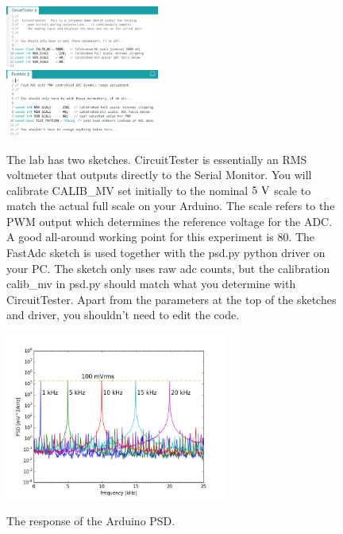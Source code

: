 \documentclass[12pt]{article}
\begin{document}
\begin{figure}[htbp]
\begin{center}
{\includegraphics[width=0.45\textwidth]{figs/test_circuit.png}}\\
{\includegraphics[width=0.45\textwidth]{figs/fast_adc.png}}
\end{center}
\caption{\label{fig:sketches}  The lab has two sketches.   CircuitTester is essentially an RMS voltmeter that outputs directly to the Serial Monitor.  You will calibrate CALIB\_MV set initially to the nominal $5~\rm V$ scale to match the actual full scale on your Arduino.  The scale refers to the PWM output which determines the reference voltage for the ADC.  A good all-around working point for this experiment is 80.
The FastAdc sketch is used together with the psd.py python driver on your PC.  The sketch only uses raw adc counts, but the calibration calib\_mv in psd.py should match what you determine with CircuitTester.  Apart from the parameters at the top of the sketches and driver, you shouldn't need to edit the code.}\end{figure}

\begin{figure}[htbp]
\begin{center}
{\includegraphics[width=0.65\textwidth]{figs/response.png}}
\end{center}
\caption{\label{fig:response}  The response of the Arduino PSD.}\end{figure}
\end{document}
